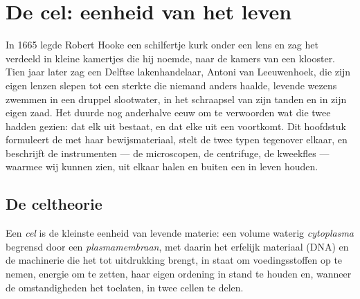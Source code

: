 \chapter{De cel: eenheid van het leven}\label{ch:b1:cell-unit-of-life}

In 1665 legde Robert Hooke een schilfertje kurk onder een lens en zag het
verdeeld in kleine kamertjes die hij  noemde, naar de kamers van een
klooster. Tien jaar later zag een Delftse lakenhandelaar, Antoni van
Leeuwenhoek, die zijn eigen lenzen slepen tot een sterkte die niemand anders
haalde, levende wezens zwemmen in een druppel slootwater, in het schraapsel van
zijn tanden en in zijn eigen zaad. Het duurde nog anderhalve eeuw om te
verwoorden wat die twee hadden gezien: dat elk  uit  bestaat, en
dat elke  uit een  voortkomt. Dit hoofdstuk formuleert de  met
haar bewijsmateriaal, stelt de twee typen  tegenover elkaar, en beschrijft
de instrumenten --- de microscopen, de centrifuge, de kweekfles --- waarmee wij
 kunnen zien, uit elkaar halen en buiten een  in leven houden.

\section{De celtheorie}

\begin{definition}[Cel]\label{def:b1:cell-unit-of-life:cell}
Een \emph{cel} is de kleinste eenheid van levende materie: een
volume waterig \emph{cytoplasma} begrensd door een
\emph{plasmamembraan}, met daarin het erfelijk materiaal
(DNA) en de machinerie die het tot uitdrukking brengt, in staat om
voedingsstoffen op te nemen, energie om te zetten, haar eigen ordening in stand
te houden en, wanneer de omstandigheden het toelaten, in twee cellen te delen.
\end{definition}

